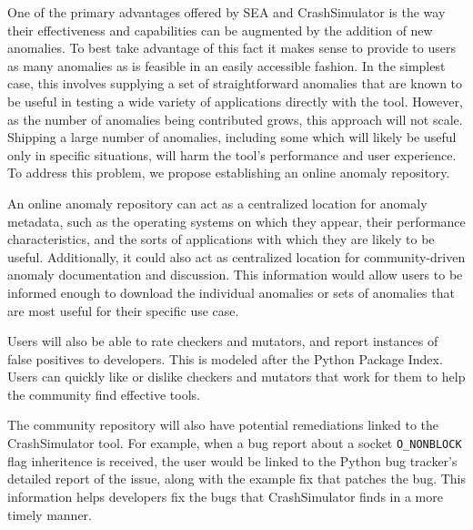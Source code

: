 One of the primary advantages offered by SEA and CrashSimulator is the way
their effectiveness and capabilities can be augmented by the addition of
new anomalies.  To best take advantage of this fact it makes sense to
provide to users as many anomalies as is feasible in an easily accessible
fashion.  In the simplest case, this involves supplying a set of
straightforward anomalies that are known to be useful in testing a wide
variety of applications directly with the tool.
However, as the number of anomalies being contributed grows, this approach
will not scale.  Shipping a large number of anomalies, including some 
which will likely be useful only in specific situations, will harm the
tool's performance and user experience.  To address this problem, we
propose establishing an online anomaly repository.

An online anomaly repository can act as a centralized location for anomaly
metadata, such as
the operating systems on which they appear,
their performance characteristics, and the sorts of applications
with which they are likely to be useful.  Additionally, it could also
act as centralized location for community-driven anomaly documentation
and discussion.  This information would allow users to be informed enough
to download the individual anomalies or sets of anomalies that are most
useful for their specific use case.

Users will also be able to rate checkers and mutators, and report instances
of false positives to developers.  This is modeled after the Python Package
Index.  Users can quickly like or dislike
checkers and mutators that work for them to help the community find effective
tools.

The community repository will also have potential remediations linked to  
the CrashSimulator tool.  For example, when a bug report about a
socket {\tt O\_NONBLOCK} flag inheritence is received, the user would be linked to the Python
bug tracker's detailed report of the issue, along with the example fix that
patches the bug.  This information helps developers fix the 
bugs that CrashSimulator finds in a more timely manner.


%


%


